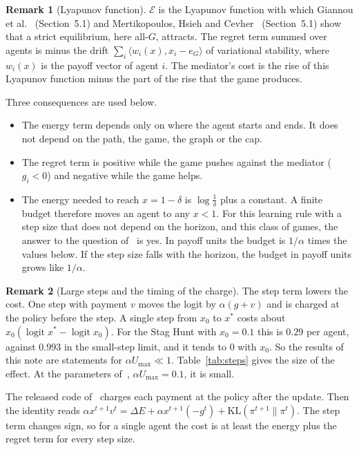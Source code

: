 \documentclass[11pt,a4paper]{article}
\theoremstyle{definition}
\newtheorem{remark}{Remark}
\theoremstyle{plain}
\newcommand{\xs}{x^{*}}
\newcommand{\KL}{\mathrm{KL}}
\newcommand{\En}{\mathcal{E}}
\begin{document}
\begin{remark}[Lyapunov function]\label{rem:lyap}
$\En$ is the Lyapunov function with which Giannou et al.~\cite{giannou2021} (Section~5.1) and Mertikopoulos, Hsieh and Cevher~\cite{mertikopoulos2023} (Section~5.1) show that a strict equilibrium, here all-$G$, attracts. The regret term summed over agents is minus the drift $\sum_i\langle w_i(x),x_i-e_G\rangle$ of variational stability, where $w_i(x)$ is the payoff vector of agent $i$. The mediator's cost is the rise of this Lyapunov function minus the part of the rise that the game produces.
\end{remark}

Three consequences are used below.
\begin{itemize}
\item The energy term depends only on where the agent starts and ends. It does not depend on the path, the game, the graph or the cap.
\item The regret term is positive while the game pushes against the mediator ($g_i<0$) and negative while the game helps.
\item The energy needed to reach $x=1-\delta$ is $\log\frac1\delta$ plus a constant. A finite budget therefore moves an agent to any $x<1$. For this learning rule with a step size that does not depend on the horizon, and this class of games, the answer to the question of~\cite{zhang2024} is yes. In payoff units the budget is $1/\alpha$ times the values below. If the step size falls with the horizon, the budget in payoff units grows like $1/\alpha$.
\end{itemize}

\begin{remark}[Large steps and the timing of the charge]\label{rem:steps}
The step term lowers the cost. One step with payment $v$ moves the logit by $\alpha(g+v)$ and is charged at the policy before the step. A single step from $x_0$ to $\xs$ costs about $x_0(\operatorname{logit}\xs-\operatorname{logit}x_0)$. For the Stag Hunt with $x_0=0.1$ this is $0.29$ per agent, against $0.993$ in the small-step limit, and it tends to $0$ with $x_0$. So the results of this note are statements for $\alpha U_{\max}\ll1$. Table~\ref{tab:steps} gives the size of the effect. At the parameters of~\cite{huang2025}, $\alpha U_{\max}=0.1$, it is small.

The released code of~\cite{huang2025} charges each payment at the policy after the update. Then the identity reads $\alpha x^{t+1}v^t=\Delta E+\alpha x^{t+1}(-g^t)+\KL(\pi^{t+1}\|\pi^t)$. The step term changes sign, so for a single agent the cost is at least the energy plus the regret term for every step size.
\end{remark}
\end{document}
